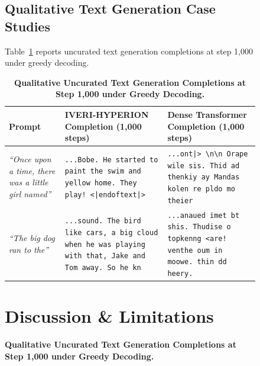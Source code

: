 \documentclass[10pt,twocolumn,letterpaper]{article}
\begin{document}
\begin{figure}[t]
\subsection{Qualitative Text Generation Case Studies}
Table~\ref{tab:qualitative} reports uncurated text generation completions at step 1,000 under greedy decoding.

\begin{table}[t]
\centering
\small
\caption{\textbf{Qualitative Uncurated Text Generation Completions at Step 1,000 under Greedy Decoding.}}
\label{tab:qualitative}
\begin{tabularx}{\textwidth}{lXX}
\toprule
\textbf{Prompt} & \textbf{IVERI-HYPERION Completion (1,000 steps)} & \textbf{Dense Transformer Completion (1,000 steps)} \\
\midrule
\textit{``Once upon a time, there was a little girl named''} & \texttt{...Bobe. He started to paint the swim and yellow home. They play! <|endoftext|>} & \texttt{...ont|> \textbackslash n\textbackslash n Orape wile sis. Thid ad thenkiy ay Mandas kolen re pldo mo theier} \\
\midrule
\textit{``The big dog ran to the''} & \texttt{...sound. The bird like cars, a big cloud when he was playing with that, Jake and Tom away. So he kn} & \texttt{...anaued imet bt shis. Thudise o topkenng <are! venthe oum in moowe. thin dd heery.} \\
\bottomrule
\end{tabularx}
\end{table}

\section{Discussion \& Limitations}
\label{sec:discussion}


\end{figure}
\end{document}
